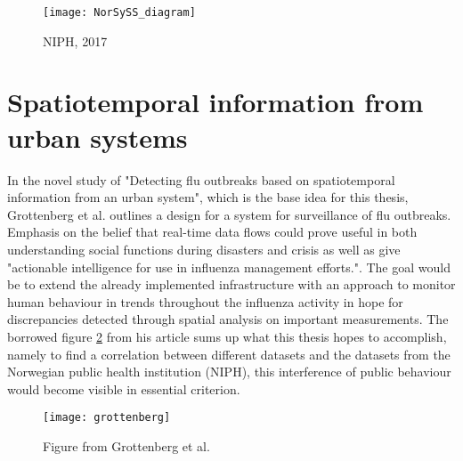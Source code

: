 \begin{figure}[!htb]
\texttt{[image: NorSySS\_diagram]}
\centering
\caption{NIPH, 2017}
\label{fig:norsyss}
\end{figure}

\newpage


\section{Spatiotemporal information from urban systems}
In the novel study of "Detecting flu outbreaks based on spatiotemporal information from an urban system", which is the base idea for this thesis, Grottenberg et al. \cite{spatiotemp_urban_sys} outlines a design for a system for surveillance of flu outbreaks. Emphasis on the belief that real-time data flows could prove useful in both understanding social functions during disasters and crisis as well as give "actionable intelligence for use in influenza management efforts.". The goal would be to extend the already implemented infrastructure with an approach to monitor human behaviour in trends throughout the influenza activity in hope for discrepancies detected through spatial analysis on important measurements. The borrowed figure \ref{fig:grottenberg} from his article sums up what this thesis hopes to accomplish, namely to find a correlation between different datasets and the datasets from the Norwegian public health institution (NIPH), this interference of public behaviour would become visible in essential criterion.


\begin{figure}[!htb]
\texttt{[image: grottenberg]}
\centering
\caption{Figure from Grottenberg et al. \cite{spatiotemp_urban_sys}}
\label{fig:grottenberg}
\end{figure}

\newpage



